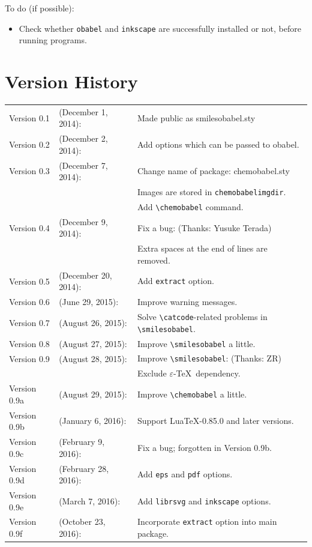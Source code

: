 \documentclass[12pt]{jsarticle}
\begin{document}
\clearpage

To do (if possible):
\begin{itemize}
\item Check whether \texttt{obabel} and \texttt{inkscape} are successfully installed or not, before running programs.
\end{itemize}

\section{Version History}

\begin{table}[h]
\centering
\begin{tabular}{lll}
Version 0.1 & (December  1, 2014): & Made public as \textsf{smilesobabel.sty} \\
Version 0.2 & (December  2, 2014): & Add options which can be passed to obabel. \\
Version 0.3 & (December  7, 2014): & Change name of package: \textsf{chemobabel.sty} \\
            &                      & Images are stored in \texttt{chemobabelimgdir}. \\
            &                      & Add \verb|\chemobabel| command. \\
Version 0.4 & (December  9, 2014): & Fix a bug: (Thanks: Yusuke Terada) \\
            &                      & Extra spaces at the end of lines are removed. \\
Version 0.5 & (December 20, 2014): & Add \verb|extract| option. \\
Version 0.6 & (June     29, 2015): & Improve warning messages. \\
Version 0.7 & (August   26, 2015): & Solve \verb|\catcode|-related problems in \verb|\smilesobabel|. \\
Version 0.8 & (August   27, 2015): & Improve \verb|\smilesobabel| a little. \\
Version 0.9 & (August   28, 2015): & Improve \verb|\smilesobabel|: (Thanks: ZR) \\
            &                      & Exclude $\varepsilon$-\TeX\ dependency. \\
Version 0.9a & (August   29, 2015): & Improve \verb|\chemobabel| a little. \\
Version 0.9b & (January   6, 2016): & Support Lua\TeX-0.85.0 and later versions. \\
Version 0.9c & (February  9, 2016): & Fix a bug; forgotten in Version 0.9b. \\
Version 0.9d & (February 28, 2016): & Add \verb|eps| and \verb|pdf| options. \\
Version 0.9e & (March     7, 2016): & Add \verb|librsvg| and \verb|inkscape| options. \\
Version 0.9f & (October  23, 2016): & Incorporate \verb|extract| option into main package.
\end{tabular}
\end{table}
\end{document}
